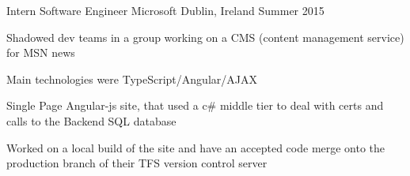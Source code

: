 \begin{cventries}
  \cventry
    {Intern Software Engineer} %
    {Microsoft} %
    {Dublin, Ireland} %
    {Summer 2015} %
    {
      \begin{cvitems} %
        \item {Shadowed dev teams in a group working on a CMS (content management service) for MSN news}
        \item {Main technologies were TypeScript/Angular/AJAX}
        \item {Single Page Angular-js site, that used a c\# middle tier to deal with certs and calls to the Backend SQL database}
        \item {Worked on a local build of the site and have an accepted code merge onto the production branch of their TFS version control server}
      \end{cvitems}
    }



\end{cventries}
